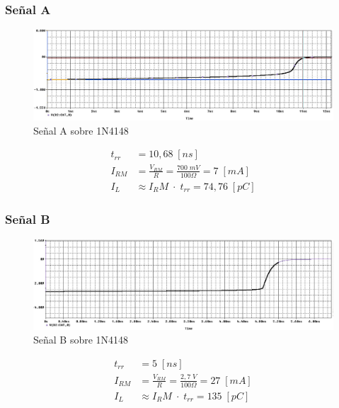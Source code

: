 \documentclass{article}
\begin{document}
\subsubsection{Señal A}
\begin{figure}[h!]
 \begin{center}
	\includegraphics[width=\textwidth]{imagenes/1N4148_A.jpg} 
	\caption{Señal A sobre 1N4148}
 \end{center}
\end{figure}
\begin{align*}
	t_{rr} &= 10,68 \; [ns] \\
	I_{RM}	&= \frac{V_{RM}}{R} = \frac{700 \; mV}{100 \Omega} = 7 \; [mA] \\
	I_L	&\approx {I_RM} \; \cdot \; t_{rr} = 74,76 \; [pC]
\end{align*}
%
\subsubsection{Señal B}
\begin{figure}[h!]
 \begin{center}
	\includegraphics[width=\textwidth]{imagenes/1N4148_B.jpg} 
	\caption{Señal B sobre 1N4148}
 \end{center}
\end{figure}
\begin{align*}
	t_{rr} &= 5 \; [ns] \\
	I_{RM}	&= \frac{V_{RM}}{R} = \frac{2,7 \; V}{100 \Omega} = 27 \; [mA] \\
	I_L	&\approx {I_RM} \; \cdot \; t_{rr} = 135 \; [pC]
\end{align*}
%
\end{document}
